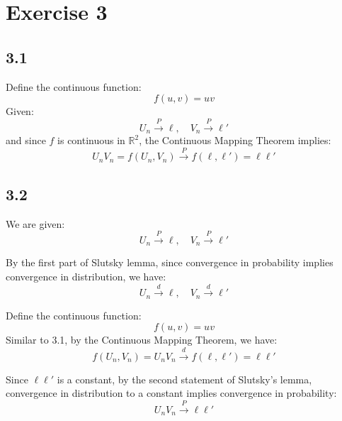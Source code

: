 \documentclass[12pt]{article}
\begin{document}
\begin{flushleft}
\begin{enumerate}[label=(\alph*)]
\end{enumerate}

\section*{Exercise 3}

\subsection*{3.1}
Define the continuous function:
\[
f(u,v) = uv
\]
Given:
\[
U_n \xrightarrow{P} \ell, \quad V_n \xrightarrow{P} \ell'
\]
and since \(f\) is continuous in \(\mathbb{R}^2\), the Continuous Mapping Theorem implies:
\[
U_n V_n = f(U_n, V_n) \xrightarrow{P} f(\ell, \ell') = \ell \ell'
\]

\subsection*{3.2}
We are given:
\[
U_n \xrightarrow{P} \ell, \quad V_n \xrightarrow{P} \ell'
\]

By the first part of Slutsky lemma, since convergence in probability implies convergence in distribution, we have:
\[
U_n \xrightarrow{d} \ell, \quad V_n \xrightarrow{d} \ell'
\]



Define the continuous function:
\[
f(u, v) = uv
\]
Similar to 3.1, by the Continuous Mapping Theorem, we have:
\[
f(U_n, V_n) = U_n V_n \xrightarrow{d} f(\ell, \ell') = \ell \ell'
\]


Since \(\ell \ell'\) is a constant, by the second statement of Slutsky's lemma, convergence in distribution to a constant implies convergence in probability:
\[
U_n V_n \xrightarrow{P} \ell \ell'
\]




\end{flushleft}
\end{document}
